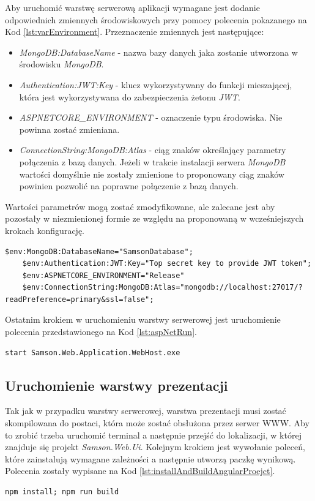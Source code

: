 \documentclass[a4paper,twoside,12pt]{book}
\begin{document}
{Aby uruchomić warstwę serwerową aplikacji wymagane jest dodanie odpowiednich zmiennych środowiskowych przy pomocy polecenia pokazanego na Kod \ref{lst:varEnvironment}. Przeznaczenie zmiennych jest następujące:
\begin{itemize}
	\item \textit{MongoDB:DatabaseName} - nazwa bazy danych jaka zostanie utworzona w środowisku \textit{MongoDB}.
	\item \textit{Authentication:JWT:Key} - klucz wykorzystywany do funkcji mieszającej, która jest wykorzystywana do zabezpieczenia żetonu \textit{JWT}.
	\item \textit{ASPNETCORE\_ENVIRONMENT} - oznaczenie typu środowiska. Nie powinna zostać zmieniana.
	\item \textit{ConnectionString:MongoDB:Atlas} - ciąg znaków określający parametry połączenia z bazą danych. Jeżeli w trakcie instalacji serwera \textit{MongoDB} wartości domyślnie nie zostały zmienione to proponowany ciąg znaków powinien pozwolić na poprawne połączenie z bazą danych.
\end{itemize}
Wartości parametrów mogą zostać zmodyfikowane, ale zalecane jest aby pozostały w niezmienionej formie ze względu na proponowaną w wcześniejszych krokach konfigurację.
\begin{lstlisting}[caption={Ustawienie wartości zmiennych środowiskowych}, label={lst:varEnvironment}]
	$env:MongoDB:DatabaseName="SamsonDatabase";
	$env:Authentication:JWT:Key="Top secret key to provide JWT token";
	$env:ASPNETCORE_ENVIRONMENT="Release"
	$env:ConnectionString:MongoDB:Atlas="mongodb://localhost:27017/?readPreference=primary&ssl=false";
\end{lstlisting}

Ostatnim krokiem w uruchomieniu warstwy serwerowej jest uruchomienie polecenia przedstawionego na Kod \ref{lst:aspNetRun}.
\begin{lstlisting}[caption={Uruchomienie warstwy serwerowej aplikacji}, label={lst:aspNetRun}]
	start Samson.Web.Application.WebHost.exe
\end{lstlisting}

\subsection{Uruchomienie warstwy prezentacji}
Tak jak w przypadku warstwy serwerowej, warstwa prezentacji musi zostać skompilowana do postaci, która może zostać obsłużona przez serwer WWW. Aby to zrobić trzeba uruchomić terminal a następnie przejść do lokalizacji, w której znajduje się projekt \textit{Samson.Web.Ui}. Kolejnym krokiem jest wywołanie poleceń, które zainstalują wymagane zależności a następnie utworzą paczkę wynikową. Polecenia zostały wypisane na Kod \ref{lst:installAndBuildAngularProejct}.
\begin{lstlisting}[caption={Polecenie, które tworzy paczkę możliwą do uruchomienia przez serwer WWW}, label={lst:installAndBuildAngularProejct}]
	npm install; npm run build
\end{lstlisting}

}
\end{document}
